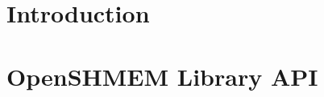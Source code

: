 \documentclass[10pt]{book}
\begin{document}
\hypersetup{pageanchor=true,citecolor=blue}

\pagestyle{fancy}
\fancyhead{}
\fancyhead[LE,LO]{\insertDocVersion}
\fancyfoot[CE,CO]{\thepage}%

\setcounter{tocdepth}{3}
\tableofcontents
\mainmatter  %
\pagestyle{fancy} \withlinenumbers%
\fancyhf{}
\fancyhead[RE, LO]{\rightmark}
\fancyhead[RO, LE]{\thepage}
\renewcommand{\headrulewidth}{0pt}
\renewcommand{\thesection}{\arabic{section}}
{ %
\setlength{\parskip}{3pt} %
\startchap
\section*{Introduction}
\label{sec:intro}
%
%
%

\label{subsec:osh_project}

\label{subsec:programming_model}

\label{subsec:memory_model}

%

\label{subsec:library_constants}

\label{subsec:environment_variables}
\label{subsec:language_bindings}

\clearpage

\startchap
\section{OpenSHMEM Library API}
\label{sec:openshmem_library_api}
}
\end{document}
